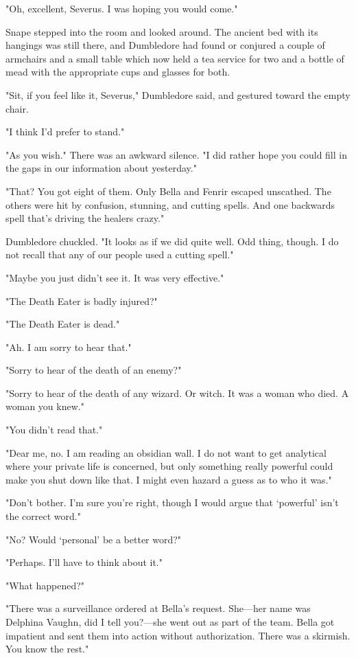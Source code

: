 "Oh, excellent, Severus. I was hoping you would come."

Snape stepped into the room and looked around. The ancient bed with its hangings was still there, and Dumbledore had found or conjured a couple of armchairs and a small table which now held a tea service for two and a bottle of mead with the appropriate cups and glasses for both.

"Sit, if you feel like it, Severus," Dumbledore said, and gestured toward the empty chair.

"I think I'd prefer to stand."

"As you wish." There was an awkward silence. "I did rather hope you could fill in the gaps in our information about yesterday."

"That? You got eight of them. Only Bella and Fenrir escaped unscathed. The others were hit by confusion, stunning, and cutting spells. And one backwards spell that's driving the healers crazy."

Dumbledore chuckled. "It looks as if we did quite well. Odd thing, though. I do not recall that any of our people used a cutting spell."

"Maybe you just didn't see it. It was very effective."

"The Death Eater is badly injured?"

"The Death Eater is dead."

"Ah. I am sorry to hear that."

"Sorry to hear of the death of an enemy?"

"Sorry to hear of the death of any wizard. Or witch. It was a woman who died. A woman you knew."

"You didn't read that."

"Dear me, no. I am reading an obsidian wall. I do not want to get analytical where your private life is concerned, but only something really powerful could make you shut down like that. I might even hazard a guess as to who it was."

"Don't bother. I'm sure you're right, though I would argue that `powerful' isn't the correct word."

"No? Would `personal' be a better word?"

"Perhaps. I'll have to think about it."

"What happened?"

"There was a surveillance ordered at Bella's request. She—her name was Delphina Vaughn, did I tell you?—she went out as part of the team. Bella got impatient and sent them into action without authorization. There was a skirmish. You know the rest."

